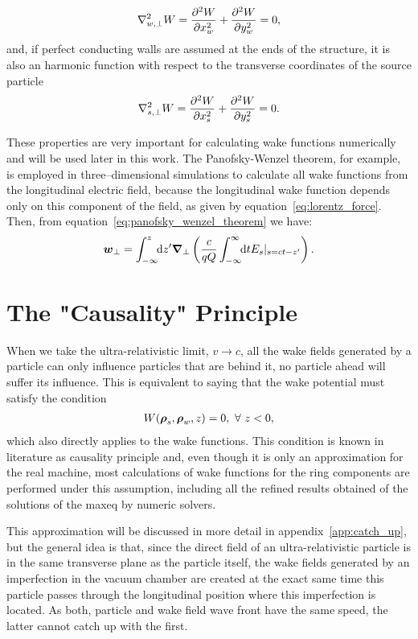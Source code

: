     \begin{align}\label{eq:potential_harmonic}
  	  	\nabla^2_{w,\perp} W = \derpar[2]{W}{x_w} + \derpar[2]{W}{y_w} = 0,
    \end{align}
    and, if perfect conducting walls are assumed at the ends of the structure, it is also an harmonic function with respect to the transverse coordinates of the source particle~\cite{Zagorodnov2015}
    \begin{align}\label{eq:potential_harmonic_source}
  	  	\nabla^2_{s,\perp} W = \derpar[2]{W}{x_s} + \derpar[2]{W}{y_s} = 0.
    \end{align}

    These properties are very important for calculating wake functions numerically and will be used later in this work. The Panofsky-Wenzel theorem, for example, is employed in three--dimensional simulations to calculate all wake functions from the longitudinal electric field, because the longitudinal wake function depends only on this component of the field, as given by equation~\eqref{eq:lorentz_force}. Then, from equation~\eqref{eq:panofsky_wenzel_theorem} we have:
    \begin{align}
  	  	\vect{w}_\perp = \defint{z'}{\vect{\nabla}_\perp\left(\frac{c}{qQ}\infint{t}{E_s|_{s=ct-z'}}\right)}{-\infty}{z}.
    \end{align}

\section{The "Causality" Principle}

    When we take the ultra-relativistic limit, $v \to c$, all the wake fields generated by a particle can only influence particles that are behind it, no particle ahead will suffer its influence. This is equivalent to saying that the wake potential must satisfy the condition
    \begin{align}
  	  	W(\vect{\rho}_s, \vect{\rho}_w, z) = 0, \,\,  \forall\,\, z < 0,
    \end{align}
    which also directly applies to the wake functions. This condition is known in literature as causality principle and, even though it is only an approximation for the real machine, most calculations of wake functions for the ring components are performed under this assumption, including all the refined results obtained of the solutions of the \gls{maxeq} by numeric solvers.

    This approximation will be discussed in more detail in appendix~\ref{app:catch_up}, but the general idea is that, since the direct field of an ultra-relativistic particle is in the same transverse plane as the particle itself, the wake fields generated by an imperfection in the vacuum chamber are created at the exact same time this particle passes through the longitudinal position where this imperfection is located. As both, particle and wake field wave front have the same speed, the latter cannot catch up with the first.

